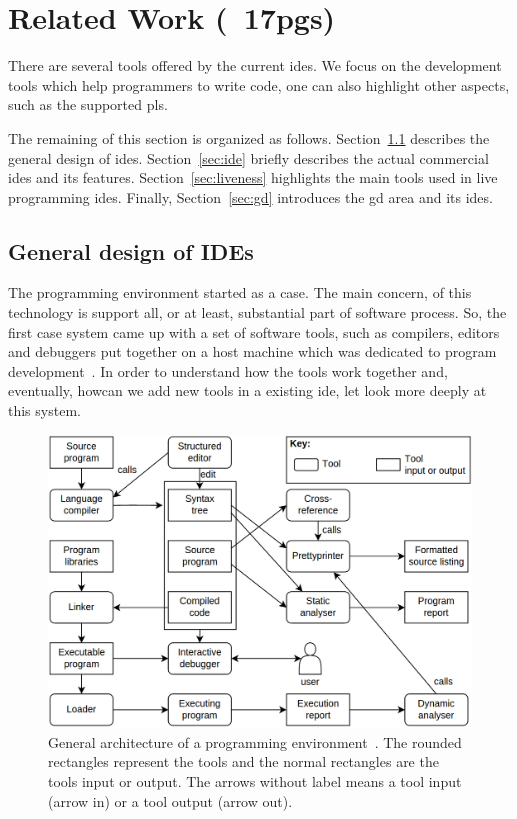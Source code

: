 
% 
% 

\section{Related Work (~17pgs)}
\label{sec:rw}

There are several tools offered by the current \ac{ide}s. We focus on the development tools which help programmers to write code, one can also highlight other aspects, such as the supported \ac{pl}s.

The remaining of this section is organized as follows. Section~\ref{sec:gdide} describes the general design of \ac{ide}s. Section~\ref{sec:ide} briefly describes the actual commercial \ac{ide}s and its features. Section~\ref{sec:liveness} highlights the main tools used in live programming \ac{ide}s. Finally, Section~\ref{sec:gd} introduces the \ac{gd} area and its \ac{ide}s.

\subsection{General design of IDEs}
\label{sec:gdide}

The programming environment started as a \ac{case}. The main concern, of this technology is support all, or at least, substantial part of software process. So, the first \ac{case} system came up with a set of software tools, such as compilers, editors and debuggers put together on a host machine which was dedicated to program development~\cite{ivie1977programmer}. In order to understand how the tools work together and, eventually, howcan we add new tools in a existing \ac{ide}, let look more deeply at this system. 

\begin{figure}[h]
  \centering
  \includegraphics[scale=0.2]{img/pwb}
    \caption{General architecture of a programming environment~\cite{sommerville1996software}. The rounded rectangles represent the tools and the normal rectangles are the tools input or output. The  arrows without label means a tool input (arrow in) or a tool output (arrow out).}
  \label{fig:pwd}
\end{figure}

